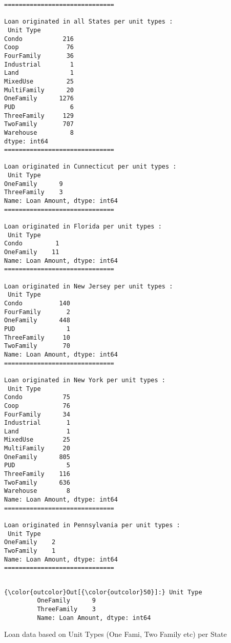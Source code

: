\documentclass[11pt]{article}
\begin{document}
    \begin{Verbatim}[commandchars=\\\{\}]
==============================
 
Loan originated in all States per unit types : 
 Unit Type
Condo           216
Coop             76
FourFamily       36
Industrial        1
Land              1
MixedUse         25
MultiFamily      20
OneFamily      1276
PUD               6
ThreeFamily     129
TwoFamily       707
Warehouse         8
dtype: int64
==============================
 
Loan originated in Cunnecticut per unit types : 
 Unit Type
OneFamily      9
ThreeFamily    3
Name: Loan Amount, dtype: int64
==============================
 
Loan originated in Florida per unit types : 
 Unit Type
Condo         1
OneFamily    11
Name: Loan Amount, dtype: int64
==============================
 
Loan originated in New Jersey per unit types : 
 Unit Type
Condo          140
FourFamily       2
OneFamily      448
PUD              1
ThreeFamily     10
TwoFamily       70
Name: Loan Amount, dtype: int64
==============================
 
Loan originated in New York per unit types : 
 Unit Type
Condo           75
Coop            76
FourFamily      34
Industrial       1
Land             1
MixedUse        25
MultiFamily     20
OneFamily      805
PUD              5
ThreeFamily    116
TwoFamily      636
Warehouse        8
Name: Loan Amount, dtype: int64
==============================
 
Loan originated in Pennsylvania per unit types : 
 Unit Type
OneFamily    2
TwoFamily    1
Name: Loan Amount, dtype: int64
==============================
 

    \end{Verbatim}

\begin{Verbatim}[commandchars=\\\{\}]
{\color{outcolor}Out[{\color{outcolor}50}]:} Unit Type
         OneFamily      9
         ThreeFamily    3
         Name: Loan Amount, dtype: int64
\end{Verbatim}
            
    Loan data based on Unit Types (One Fami, Two Family etc) per State
\end{document}
